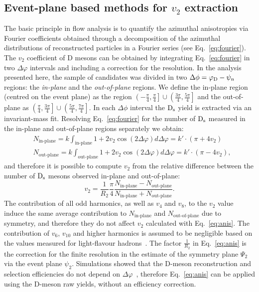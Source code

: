 \subsection{Event-plane based methods for $v_2$ extraction} 
\label{sec:epMethodsDescript}
The basic principle in flow analysis is to quantify the azimuthal 
anisotropies via Fourier coefficients obtained through a 
decomposition of the azimuthal distributions of reconstructed particles in a Fourier series (see Eq.~\ref{eq:fourier}).
The $v_2$ coefficient of D mesons can be obtained by integrating Eq.~\ref{eq:fourier}
in two $\Delta \varphi$ intervals and including a correction for the
resolution. In the analysis presented here, the sample of candidates was 
divided in two $\Delta\phi = \varphi_{\rm D}-\psi_n$ regions: the \textit{in-plane} 
and the \textit{out-of-plane} regions. We define the in-plane 
region (centred on the event plane) as the region 
$\left(-\frac{\pi}{4},\frac{\pi}{4}\right]\cup\left(\frac{3\pi}{4},\frac{5\pi}{4}\right]$ and
 the out-of-plane as $\left(\frac{\pi}{4},\frac{3\pi}{4}\right]\cup\left(\frac{5\pi}{4},\frac{7\pi}{4}\right]$. 
 In each $\Delta\phi$ interval the ${\rm D_s}$ yield is extracted via
an invariant-mass fit. Resolving Eq.~\ref{eq:fourier} for the number of ${\rm D_s}$ measured 
 in the in-plane and out-of-plane regions separately we obtain:
\begin{equation}\label{eq:ninout}
 \begin{split}
  & N_\text{in-plane} = k\int_\text{in-plane}1+2v_2\cos(2\Delta \varphi)d\Delta \varphi = k'\cdot(\pi+4v_2)\\
  & N_\text{out-plane} = k\int_\text{out-plane}1+2v_2\cos(2\Delta \varphi)d\Delta \varphi= k'\cdot(\pi-4v_2),
 \end{split}
\end{equation}
and therefore it is possible to compute $v_2$ from the relative 
difference between the number of ${\rm D_s}$ mesons observed in-plane and out-of-plane:
\begin{equation}
\label{eq:anis}
 v_2 = \frac{1}{R_2} \frac{\pi}{4}\frac{N_\text{in-plane}-N_\text{out-plane}}{N_\text{in-plane}+N_\text{out-plane}}.
\end{equation}
The contribution of all odd harmonics, 
as well as $v_4$ and $v_8$, to the $v_2$ value induce the same average 
contribution to $N_\text{in-plane}$ and $N_\text{out-of-plane}$ 
due to symmetry, and therefore they do not affect $v_2$ calculated with 
Eq.~\ref{eq:anis}. The contribution of $v_6$, $v_{10}$ and higher 
harmonics is assumed to be negligible based on the 
values measured for light-flavour hadrons~\cite{Aamodt:2011by,ATLAS:2012at}.
The factor $\frac{1}{R_2}$ in Eq.~\ref{eq:anis} is the correction for the finite resolution in the
estimate of the symmetry plane $\Psi_2$ via the event plane $\psi_2$.
 Simulations showed that the D-meson reconstruction 
 and selection efficiencies do not depend on $\Delta\varphi$~\cite{Abelev:2014ipa}, 
therefore Eq.~\ref{eq:anis} can be applied using the 
D-meson raw yields, without an efficiency correction.

